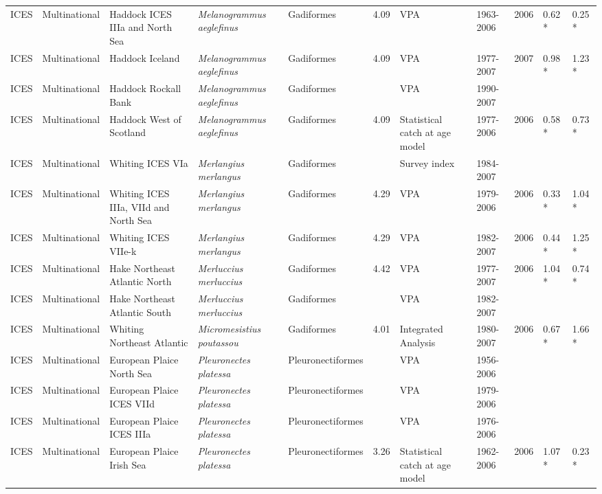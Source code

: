 \begin{longtable}{p{1.5cm}p{1.5cm}p{3cm}p{3cm}p{2.5cm}p{0.9cm}p{1.4cm}p{0.9cm}p{0.9cm}p{0.9cm}p{1cm}}
  ICES & Multinational & Haddock ICES IIIa and North Sea & \textit{Melanogrammus aeglefinus} & Gadiformes & 4.09 & VPA & 1963-2006 & 2006 & 0.62 * & 0.25 * \\ 
  ICES & Multinational & Haddock Iceland & \textit{Melanogrammus aeglefinus} & Gadiformes & 4.09 & VPA & 1977-2007 & 2007 & 0.98 * & 1.23 * \\ 
  ICES & Multinational & Haddock Rockall Bank & \textit{Melanogrammus aeglefinus} & Gadiformes &  & VPA & 1990-2007 &  &  &  \\ 
  ICES & Multinational & Haddock West of Scotland & \textit{Melanogrammus aeglefinus} & Gadiformes & 4.09 & Statistical catch at age model & 1977-2006 & 2006 & 0.58 * & 0.73 * \\ 
  ICES & Multinational & Whiting ICES VIa & \textit{Merlangius merlangus} & Gadiformes &  & Survey index & 1984-2007 &  &  &  \\ 
  ICES & Multinational & Whiting ICES IIIa, VIId and North Sea & \textit{Merlangius merlangus} & Gadiformes & 4.29 & VPA & 1979-2006 & 2006 & 0.33 * & 1.04 * \\ 
  ICES & Multinational & Whiting ICES VIIe-k & \textit{Merlangius merlangus} & Gadiformes & 4.29 & VPA & 1982-2007 & 2006 & 0.44 * & 1.25 * \\ 
  ICES & Multinational & Hake Northeast Atlantic North & \textit{Merluccius merluccius} & Gadiformes & 4.42 & VPA & 1977-2007 & 2006 & 1.04 * & 0.74 * \\ 
  ICES & Multinational & Hake Northeast Atlantic South & \textit{Merluccius merluccius} & Gadiformes &  & VPA & 1982-2007 &  &  &  \\ 
  ICES & Multinational & Whiting Northeast Atlantic & \textit{Micromesistius poutassou} & Gadiformes & 4.01 & Integrated Analysis & 1980-2007 & 2006 & 0.67 * & 1.66 * \\ 
  ICES & Multinational & European Plaice North Sea & \textit{Pleuronectes platessa} & Pleuronectiformes &  & VPA & 1956-2006 &  &  &  \\ 
  ICES & Multinational & European Plaice ICES VIId & \textit{Pleuronectes platessa} & Pleuronectiformes &  & VPA & 1979-2006 &  &  &  \\ 
  ICES & Multinational & European Plaice ICES IIIa & \textit{Pleuronectes platessa} & Pleuronectiformes &  & VPA & 1976-2006 &  &  &  \\ 
  ICES & Multinational & European Plaice Irish Sea & \textit{Pleuronectes platessa} & Pleuronectiformes & 3.26 & Statistical catch at age model & 1962-2006 & 2006 & 1.07 * & 0.23 * \\ 

\end{longtable}

